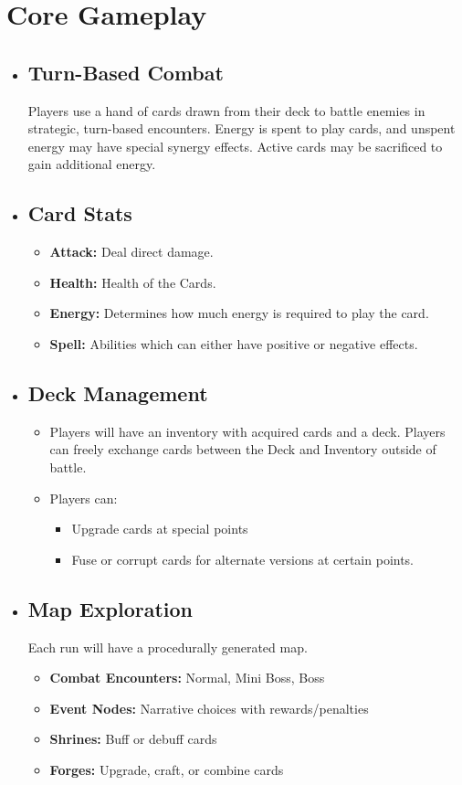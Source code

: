 \documentclass[10pt, a4paper]{article}
\begin{document}
	\section{Core Gameplay}
	\begin{itemize}
		\item \subsection{Turn-Based Combat} Players use a hand of cards drawn from their deck to battle enemies in strategic, turn-based encounters. Energy is spent to play cards, and unspent energy may have special synergy effects. Active cards may be sacrificed to gain additional energy.
		
		\item \subsection{Card Stats}
		\begin{itemize}
			\item \textbf{Attack:} Deal direct damage.
			\item \textbf{Health:} Health of the Cards.
			\item \textbf{Energy:} Determines how much energy is required to play the card.
			\item \textbf{Spell:} Abilities which can either have positive or negative effects.
		\end{itemize}
		
		\item \subsection{Deck Management} 
		\begin{itemize}
		\item Players will have an inventory with acquired cards and a deck. Players can freely exchange cards between the Deck and Inventory outside of battle.
		\item Players can:
		\begin{itemize}
			\item Upgrade cards at special points
			\item Fuse or corrupt cards for alternate versions at certain points.
		\end{itemize}
	    \end{itemize}
		\item \subsection{Map Exploration} Each run will have a procedurally generated map.
		\begin{itemize}
			\item \textbf{Combat Encounters:} Normal, Mini Boss, Boss
			\item \textbf{Event Nodes:} Narrative choices with rewards/penalties
			\item \textbf{Shrines:} Buff or debuff cards
			\item \textbf{Forges:} Upgrade, craft, or combine cards
		\end{itemize}
		

\end{itemize}
\end{document}
